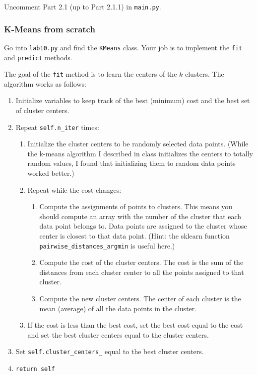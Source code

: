 \documentclass{article}
\begin{document}
Uncomment Part 2.1 (up to Part 2.1.1) in \texttt{main.py}.

\subsubsection{K-Means from scratch}

Go into \texttt{lab10.py} and find the \texttt{KMeans} class. Your job is to implement the \texttt{fit} and \texttt{predict} methods.

The goal of the \texttt{fit} method is to learn the centers of the $k$ clusters. The algorithm works as follows:

\begin{enumerate}
    \item Initialize variables to keep track of the best (minimum) cost and the best set of cluster centers.

    \item Repeat \texttt{self.n\_iter} times:
    
    \begin{enumerate}
        \item Initialize the cluster centers to be randomly selected data points. (While the k-means algorithm I described in class initializes the centers to totally random values, I found that initializing them to random data points worked better.)
    
        \item Repeat while the cost changes:
        
        \begin{enumerate}
            \item Compute the assignments of points to clusters. This means you should compute an array with the number of the cluster that each data point belongs to. Data points are assigned to the cluster whose center is closest to that data point. (Hint: the sklearn function \texttt{pairwise\_distances\_argmin} is useful here.)
            
            \item Compute the cost of the cluster centers. The cost is the sum of the distances from each cluster center to all the points assigned to that cluster.
            
            \item Compute the new cluster centers. The center of each cluster is the mean (average) of all the data points in the cluster.
        \end{enumerate}
        
        \item If the cost is less than the best cost, set the best cost equal to the cost and set the best cluster centers equal to the cluster centers.
    \end{enumerate}
    
    \item Set \texttt{self.cluster\_centers\_} equal to the best cluster centers.
    
    \item \texttt{return self}
\end{enumerate}
\end{document}
